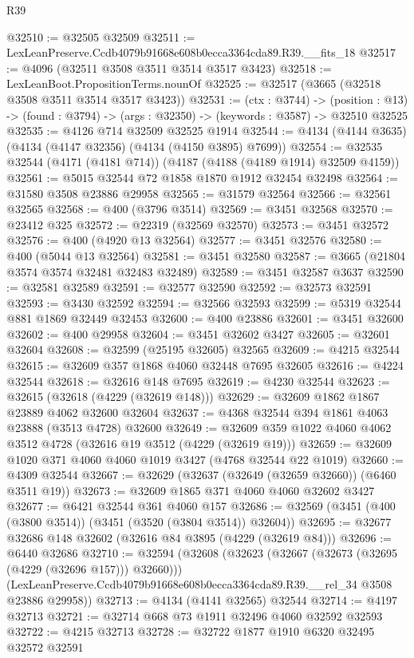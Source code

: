\begin{lexlean}{R39}
\begin{coremodule}
@32510 := @32505 @32509
@32511 := LexLeanPreserve.Ccdb4079b91668e608b0ecca3364cda89.R39.__fits_18
@32517 := @4096 (@32511 @3508 @3511 @3514 @3517 @3423)
@32518 := LexLeanBoot.PropositionTerms.nounOf
@32525 := @32517 (@3665 (@32518 @3508 @3511 @3514 @3517 @3423))
@32531 := (ctx : @3744) ->
  (position : @13) -> (found : @3794) -> (args : @32350) -> (keywords : @3587) -> @32510 @32525
@32535 := @4126 @714 @32509 @32525 @1914
@32544 := @4134 (@4144 @3635) (@4134 (@4147 @32356) (@4134 (@4150 @3895) @7699))
@32554 := @32535 @32544 (@4171 (@4181 @714)) (@4187 (@4188 (@4189 @1914) @32509 @4159))
@32561 := @5015 @32544 @72 @1858 @1870 @1912 @32454 @32498
@32564 := @31580 @3508 @23886 @29958
@32565 := @31579 @32564
@32566 := @32561 @32565
@32568 := @400 (@3796 @3514)
@32569 := @3451 @32568
@32570 := @23412 @325
@32572 := @22319 (@32569 @32570)
@32573 := @3451 @32572
@32576 := @400 (@4920 @13 @32564)
@32577 := @3451 @32576
@32580 := @400 (@5044 @13 @32564)
@32581 := @3451 @32580
@32587 := @3665 (@21804 @3574 @3574 @32481 @32483 @32489)
@32589 := @3451 @32587 @3637
@32590 := @32581 @32589
@32591 := @32577 @32590
@32592 := @32573 @32591
@32593 := @3430 @32592
@32594 := @32566 @32593
@32599 := @5319 @32544 @881 @1869 @32449 @32453
@32600 := @400 @23886
@32601 := @3451 @32600
@32602 := @400 @29958
@32604 := @3451 @32602 @3427
@32605 := @32601 @32604
@32608 := @32599 (@25195 @32605) @32565
@32609 := @4215 @32544
@32615 := @32609 @357 @1868 @4060 @32448 @7695 @32605
@32616 := @4224 @32544
@32618 := @32616 @148 @7695
@32619 := @4230 @32544
@32623 := @32615 (@32618 (@4229 (@32619 @148)))
@32629 := @32609 @1862 @1867 @23889 @4062 @32600 @32604
@32637 := @4368 @32544 @394 @1861 @4063 @23888 (@3513 @4728) @32600
@32649 := @32609 @359 @1022 @4060 @4062 @3512 @4728 (@32616 @19 @3512 (@4229 (@32619 @19)))
@32659 := @32609 @1020 @371 @4060 @4060 @1019 @3427 (@4768 @32544 @22 @1019)
@32660 := @4309 @32544
@32667 := @32629 (@32637 (@32649 (@32659 @32660)) (@6460 @3511 @19))
@32673 := @32609 @1865 @371 @4060 @4060 @32602 @3427
@32677 := @6421 @32544 @361 @4060 @157
@32686 := @32569 (@3451 (@400 (@3800 @3514)) (@3451 (@3520 (@3804 @3514)) @32604))
@32695 := @32677 @32686 @148 @32602 (@32616 @84 @3895 (@4229 (@32619 @84)))
@32696 := @6440 @32686
@32710 := @32594
    (@32608
      (@32623 (@32667 (@32673 (@32695 (@4229 (@32696 @157))) @32660)))
      (LexLeanPreserve.Ccdb4079b91668e608b0ecca3364cda89.R39.__rel_34 @3508 @23886 @29958))
@32713 := @4134 (@4141 @32565) @32544
@32714 := @4197 @32713
@32721 := @32714 @668 @73 @1911 @32496 @4060 @32592 @32593
@32722 := @4215 @32713
@32728 := @32722 @1877 @1910 @6320 @32495 @32572 @32591

\end{coremodule}
\end{lexlean}
